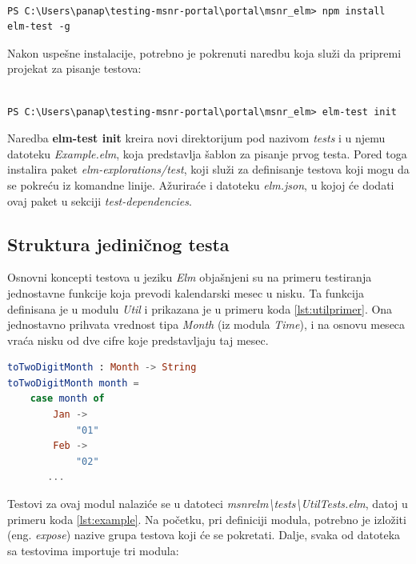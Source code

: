 \documentclass[12pt,oneside]{memoir}
\begin{document}
\begin{lstlisting}[style=DOS]

PS C:\Users\panap\testing-msnr-portal\portal\msnr_elm> npm install elm-test -g

\end{lstlisting}

\par Nakon uspešne instalacije, potrebno je pokrenuti naredbu koja služi da pripremi projekat za pisanje testova: 

\begin{lstlisting}[style=DOS]

PS C:\Users\panap\testing-msnr-portal\portal\msnr_elm> elm-test init

\end{lstlisting}

Naredba \textbf{elm-test init} kreira novi direktorijum pod nazivom \emph{tests} i u njemu datoteku \emph{Example.elm}, koja predstavlja šablon za pisanje prvog testa. Pored toga instalira paket \emph{elm-explorations/test}, koji služi za definisanje testova koji mogu da se pokreću iz komandne linije. Ažuriraće i datoteku \emph{elm.json}, u kojoj će dodati ovaj paket u sekciji \emph{test-dependencies}.

\subsection{Struktura jediničnog testa}

\par Osnovni koncepti testova u jeziku \emph{Elm} objašnjeni su na primeru testiranja jednostavne funkcije koja prevodi kalendarski mesec u nisku. Ta funkcija definisana je u modulu \emph{Util} i prikazana je u primeru koda \ref{lst:utilprimer}. Ona jednostavno prihvata vrednost tipa \emph{Month} (iz modula \emph{Time}), i na osnovu meseca vraća nisku od dve cifre koje predstavljaju taj mesec.

\begin{lstlisting}[language=elm, caption={Funkcija \emph{toTwoDigitMonth}},captionpos=b, label={lst:utilprimer}]
toTwoDigitMonth : Month -> String
toTwoDigitMonth month =
    case month of
        Jan ->
            "01"
        Feb ->
            "02"
       ...
\end{lstlisting}


\par Testovi za ovaj modul nalaziće se u datoteci \emph{msnr{\textunderscore}elm{\textbackslash}tests{\textbackslash}UtilTests.elm}, datoj u primeru koda \ref{lst:example}. Na početku, pri definiciji modula, potrebno je izložiti (eng. \emph{expose}) nazive grupa testova koji će se pokretati. Dalje, svaka od datoteka sa testovima importuje tri modula: 
\end{document}
